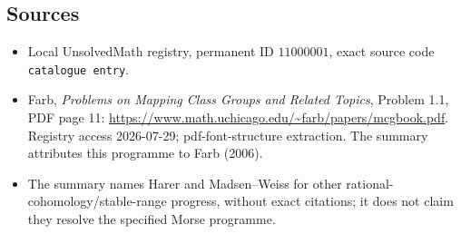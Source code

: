 \documentclass[11pt]{article}
\begin{document}
\subsection{Sources}
\begin{itemize}
\item Local UnsolvedMath registry, permanent ID \(11000001\), exact source code \texttt{catalogue entry}.
\item Farb, \emph{Problems on Mapping Class Groups and Related Topics}, Problem 1.1, PDF page 11: \url{https://www.math.uchicago.edu/~farb/papers/mcgbook.pdf}. Registry access 2026-07-29; pdf-font-structure extraction. The summary attributes this programme to Farb (2006).
\item The summary names Harer and Madsen--Weiss for other rational-cohomology/stable-range progress, without exact citations; it does not claim they resolve the specified Morse programme.
\end{itemize}
\end{document}
